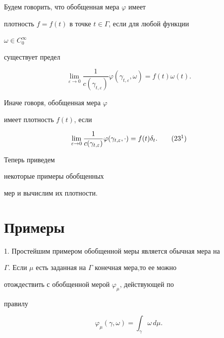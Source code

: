 \begin{defn} 


Будем говорить, что обобщенная мера $\varphi$ имеет 


плотность $f=f(t)$ в точке $t\in\Gamma$, если для любой функции 


$\omega\in C^\infty_0$ 


существует предел 


\begin{equation} 


\lim_{\varepsilon\to 0}\frac{1}{c(\gamma_{t,\varepsilon})} 


\varphi(\gamma_{t,\varepsilon},\omega)=f(t)\omega(t). 


\end{equation} 


Иначе говоря, обобщенная мера $\varphi$ 


имеет плотность $f(t)$, если 


\begin{equation} 


\lim_{\varepsilon\to 0}\frac{1}{c(\gamma_{t,\varepsilon})} 


\varphi(\gamma_{t,\varepsilon},\cdot)=f(t)\delta_t. 


\tag{23${}^1$}


\end{equation} 


\end{defn} 


 


Теперь приведем 


некоторые примеры обобщенных 


мер и вычислим их плотности. 


 


\section{Примеры} 


 


1. Простейшим примером обобщенной меры является обычная мера на 


$\Gamma$. Если $\mu$ есть заданная на $\Gamma$ конечная мера,то ее можно 


отождествить с обобщенной мерой $\varphi_\mu$, действующей по 


правилу 


\begin{equation} 


\varphi_\mu(\gamma,\omega)=\int_\gamma \omega\,d\mu. 


\end{equation} 


